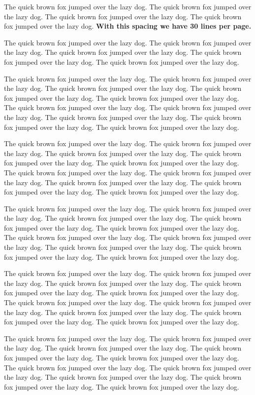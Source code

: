 \documentclass[12pt]{article}
\begin{document}
The quick brown fox jumped over the lazy dog. The quick brown fox jumped
over the lazy dog. The quick brown fox jumped over the lazy dog. The
quick brown fox jumped over the lazy dog. \textbf{With this spacing we
have 30 lines per page.}

The quick brown fox jumped over the lazy dog. The quick brown fox jumped
over the lazy dog. The quick brown fox jumped over the lazy dog. The
quick brown fox jumped over the lazy dog. The quick brown fox jumped
over the lazy dog.

The quick brown fox jumped over the lazy dog. The quick brown fox jumped
over the lazy dog. The quick brown fox jumped over the lazy dog. The
quick brown fox jumped over the lazy dog. The quick brown fox jumped
over the lazy dog. The quick brown fox jumped over the lazy dog. The
quick brown fox jumped over the lazy dog. The quick brown fox jumped
over the lazy dog. The quick brown fox jumped over the lazy dog. The
quick brown fox jumped over the lazy dog.

The quick brown fox jumped over the lazy dog. The quick brown fox jumped
over the lazy dog. The quick brown fox jumped over the lazy dog. The
quick brown fox jumped over the lazy dog. The quick brown fox jumped
over the lazy dog. The quick brown fox jumped over the lazy dog. The
quick brown fox jumped over the lazy dog. The quick brown fox jumped
over the lazy dog. The quick brown fox jumped over the lazy dog. The
quick brown fox jumped over the lazy dog.

The quick brown fox jumped over the lazy dog. The quick brown fox jumped
over the lazy dog. The quick brown fox jumped over the lazy dog. The
quick brown fox jumped over the lazy dog. The quick brown fox jumped
over the lazy dog. The quick brown fox jumped over the lazy dog. The
quick brown fox jumped over the lazy dog. The quick brown fox jumped
over the lazy dog. The quick brown fox jumped over the lazy dog. The
quick brown fox jumped over the lazy dog.

The quick brown fox jumped over the lazy dog. The quick brown fox jumped
over the lazy dog. The quick brown fox jumped over the lazy dog. The
quick brown fox jumped over the lazy dog. The quick brown fox jumped
over the lazy dog. The quick brown fox jumped over the lazy dog. The
quick brown fox jumped over the lazy dog. The quick brown fox jumped
over the lazy dog. The quick brown fox jumped over the lazy dog. The
quick brown fox jumped over the lazy dog.

The quick brown fox jumped over the lazy dog. The quick brown fox jumped
over the lazy dog. The quick brown fox jumped over the lazy dog. The
quick brown fox jumped over the lazy dog. The quick brown fox jumped
over the lazy dog. The quick brown fox jumped over the lazy dog. The
quick brown fox jumped over the lazy dog. The quick brown fox jumped
over the lazy dog. The quick brown fox jumped over the lazy dog. The
quick brown fox jumped over the lazy dog.
\end{document}
